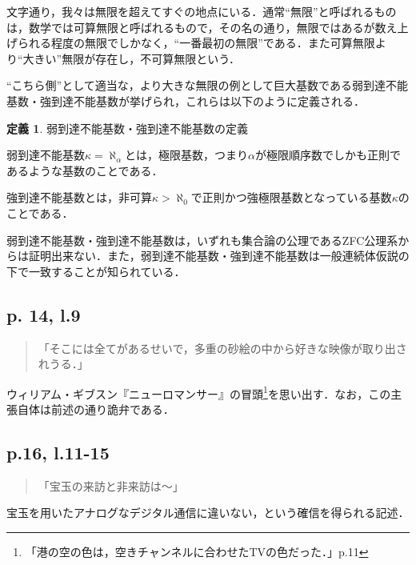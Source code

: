 \documentclass[10pt, a5paper, twoside]{jsarticle}
\theoremstyle{definition}
\newtheorem{dfn}{定義}
\begin{document}
			文字通り，我々は無限を超えてすぐの地点にいる．通常“無限”と呼ばれるものは，数学では可算無限と呼ばれるもので，その名の通り，無限ではあるが数え上げられる程度の無限でしかなく，“一番最初の無限”である．また可算無限より“大きい”無限が存在し，不可算無限という．

			“こちら側”として適当な，より大きな無限の例として巨大基数である弱到達不能基数・強到達不能基数が挙げられ，これらは以下のように定義される\cite{arai}．

			\begin{dfn}

				弱到達不能基数・強到達不能基数の定義

				弱到達不能基数$\kappa = \aleph_\alpha$とは，極限基数，つまり$\alpha$が極限順序数でしかも正則であるような基数のことである．

				強到達不能基数とは，非可算$\kappa > \aleph_0$で正則かつ強極限基数となっている基数$\kappa$のことである．
				
			\end{dfn}

			弱到達不能基数・強到達不能基数は，いずれも集合論の公理であるZFC公理系からは証明出来ない．また，弱到達不能基数・強到達不能基数は一般連続体仮説の下で一致することが知られている．

		\subsection{p. 14, l.9}

			\begin{quote}

				「そこには全てがあるせいで，多重の砂絵の中から好きな映像が取り出されうる．」
				
			\end{quote}

			ウィリアム・ギブスン『ニューロマンサー』の冒頭\footnote{「港の空の色は，空きチャンネルに合わせたTVの色だった．」\cite{neuro}p.11}を思い出す．なお，この主張自体は前述の通り詭弁である．

		\subsection{p.16, l.11-15}

			\begin{quote}

				「宝玉の来訪と非来訪は〜」
				
			\end{quote}

			宝玉を用いたアナログなデジタル通信に違いない，という確信を得られる記述．
\end{document}
